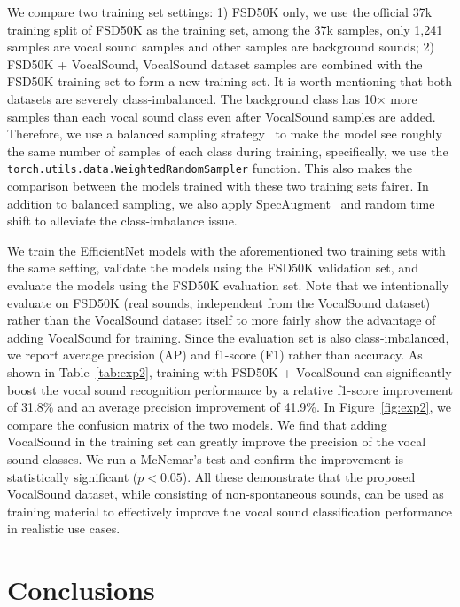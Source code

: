 \documentclass{article}
\newcommand{\squeezeup}{\vspace{-1.6mm}}
\begin{document}
We compare two training set settings: 1) FSD50K only, we use the official 37k training split of FSD50K as the training set, among the 37k samples, only 1,241 samples are vocal sound samples and other samples are background sounds; 2) FSD50K + VocalSound, VocalSound dataset samples are combined with the FSD50K training set to form a new training set. It is worth mentioning that both datasets are severely class-imbalanced. The background class has 10$\times$ more samples than each vocal sound class even after VocalSound samples are added. Therefore, we use a balanced sampling strategy~\cite{gong2021psla} to make the model see roughly the same number of samples of each class during training, specifically, we use the \texttt{torch.utils.data.WeightedRandomSampler} function. This also makes the comparison between the models trained with these two training sets fairer. In addition to balanced sampling, we also apply SpecAugment~\cite{park19e_interspeech} and random time shift to alleviate the class-imbalance issue.

We train the EfficientNet models with the aforementioned two training sets with the same setting, validate the models using the FSD50K validation set, and evaluate the models using the FSD50K evaluation set. Note that we intentionally evaluate on FSD50K (real sounds, independent from the VocalSound dataset) rather than the VocalSound dataset itself to more fairly show the advantage of adding VocalSound for training. Since the evaluation set is also class-imbalanced, we report average precision (AP) and f1-score (F1) rather than accuracy. As shown in Table~\ref{tab:exp2}, training with FSD50K + VocalSound can significantly boost the vocal sound recognition performance by a relative f1-score improvement of 31.8\% and an average precision improvement of 41.9\%. In Figure~\ref{fig:exp2}, we compare the confusion matrix of the two models. We find that adding VocalSound in the training set can greatly improve the precision of the vocal sound classes. We run a McNemar's test and confirm the improvement is statistically significant ($p<0.05$). All these demonstrate that the proposed VocalSound dataset, while consisting of non-spontaneous sounds, can be used as training material to effectively improve the vocal sound classification performance in realistic use cases.

\squeezeup\squeezeup
\section{Conclusions}
\squeezeup
\end{document}
